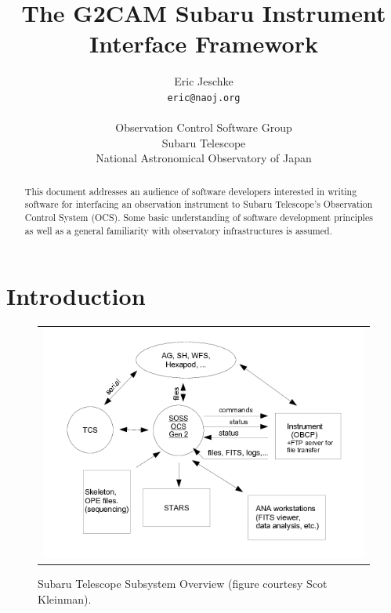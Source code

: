 \documentclass[11pt]{report}
\title{The G2CAM Subaru Instrument Interface Framework}
\author{Eric Jeschke\\
{\tt eric@naoj.org}\\
\\
Observation Control Software Group\\
Subaru Telescope\\
National Astronomical Observatory of Japan}
\begin{document}
 

\maketitle 

\begin{abstract}
This document addresses an audience of software developers interested in
writing software for interfacing an observation instrument to Subaru
Telescope's Observation Control System (OCS). Some basic understanding
of software development principles as well as a general familiarity with
observatory infrastructures is assumed. 
\end{abstract}

\tableofcontents
\setcounter{tocdepth}{3}

\newpage

\chapter{Introduction}
\label{sh:intro}

\begin{figure}
  \begin{center}
    \begin{tabular}{c}
      \includegraphics[width=5in]{OCS_schematic.png}
    \end{tabular}
  \end{center}
  \caption[example] 
          { \label{fig:obssubsys} 
            Subaru Telescope Subsystem Overview
             (figure courtesy Scot Kleinman). } 
\end{figure} 
\end{document}
